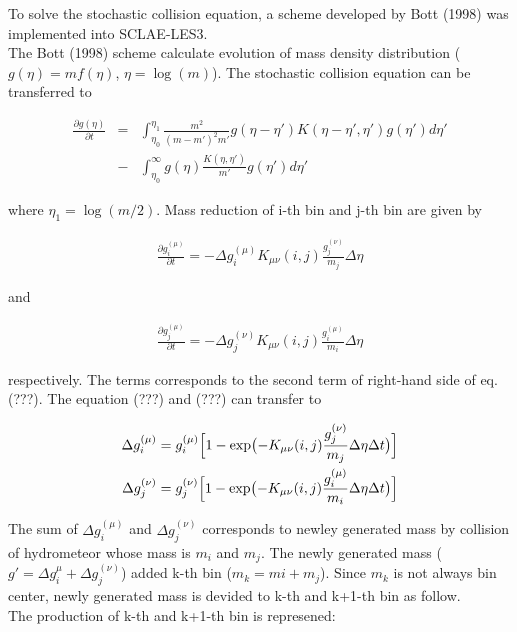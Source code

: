 To solve the stochastic collision equation, a scheme developed by Bott (1998) was implemented into SCLAE-LES3.\\ 
The Bott (1998) scheme calculate evolution of mass density distribution ($g(\eta)=mf(\eta)$, $\eta=\log(m)$). The stochastic collision equation can be transferred to 

\begin{eqnarray}
\frac{\partial g(\eta)}{\partial t}&=&\int_{\eta_{0}}^{\eta_{1}}\frac{m^{2}}{(m-m')^{2} m'}g(\eta-\eta') K(\eta-\eta',\eta')g(\eta')d\eta' \nonumber\\
&-&\int_{\eta_{0}}^{\infty} g(\eta)\frac{K(\eta,\eta')}{m'}g(\eta')d\eta'
\end{eqnarray}

 where $\eta_{1}=\log(m/2)$. Mass reduction of i-th bin and j-th bin are given by

\begin{eqnarray}
\frac{\partial g_{i}^{(\mu)}}{\partial t}=-\Delta g^{(\mu)}_{i} K_{\mu\nu}(i,j)\frac{g_{j}^{(\nu)}}{m_{j}}\Delta \eta
\end{eqnarray}

and


\begin{eqnarray}
\frac{\partial g_{j}^{(\mu)}}{\partial t}=-\Delta g^{(\nu)}_{j}K_{\mu\nu}(i,j)\frac{g_{i}^{(\mu)}}{m_{i}}\Delta \eta
\end{eqnarray}

respectively. The terms corresponds to the second term of right-hand side of eq.(???). The equation (???) and (???) can transfer to

\begin{eqnarray}
\Delta g_{i}^{(\mu)}=g_{i}^{(\mu)}\Bigl [1-\exp\bigl(-K_{\mu\nu}(i,j)\frac{g^{(\nu)}_{j}}{m_{j}}\Delta \eta\Delta t\bigr) \Bigl]\\ 
\Delta g_{j}^{(\nu)}=g_{j}^{(\nu)}\Bigl [1-\exp\bigl(-K_{\mu\nu}(i,j)\frac{g^{(\mu)}_{i}}{m_{i}}\Delta \eta\Delta t\bigr) \Bigl] 
\end{eqnarray}

The sum of $\Delta g_{i}^{(\mu)}$ and $\Delta g_{j}^{(\nu)}$ corresponds to newley generated mass by collision of hydrometeor whose mass is $m_{i}$ and $m_{j}$. The newly generated mass ($g'=\Delta g_{i}^{\mu}+\Delta g_{j}^{(\nu)}$) added k-th bin ($m_{k}=m{i}+m_{j}$). Since $m_{k}$ is not always bin center, newly generated mass is devided to k-th and k+1-th bin as follow.\\
The production of k-th and k+1-th bin is represened:

